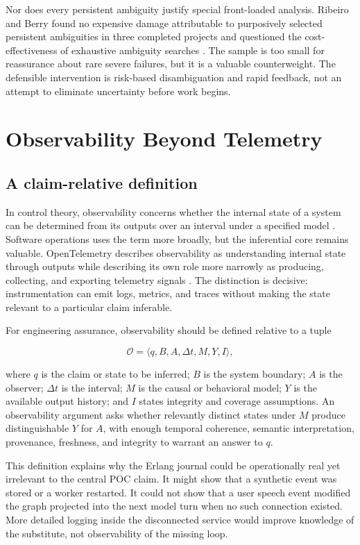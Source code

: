 \documentclass[10pt,a4paper]{article}
\begin{document}
Nor does every persistent ambiguity justify special front-loaded analysis. Ribeiro and Berry found no expensive damage attributable to purposively selected persistent ambiguities in three completed projects and questioned the cost-effectiveness of exhaustive ambiguity searches \cite{ribeiro2020}. The sample is too small for reassurance about rare severe failures, but it is a valuable counterweight. The defensible intervention is risk-based disambiguation and rapid feedback, not an attempt to eliminate uncertainty before work begins.

\section{Observability Beyond Telemetry}

\subsection{A claim-relative definition}

In control theory, observability concerns whether the internal state of a system can be determined from its outputs over an interval under a specified model \cite{kalman1960}. Software operations uses the term more broadly, but the inferential core remains valuable. OpenTelemetry describes observability as understanding internal state through outputs while describing its own role more narrowly as producing, collecting, and exporting telemetry signals \cite{otel}. The distinction is decisive: instrumentation can emit logs, metrics, and traces without making the state relevant to a particular claim inferable.

For engineering assurance, observability should be defined relative to a tuple

\begin{equation}
\mathcal{O}=\langle q, B, A, \Delta t, M, Y, I \rangle,
\end{equation}

where $q$ is the claim or state to be inferred; $B$ is the system boundary; $A$ is the observer; $\Delta t$ is the interval; $M$ is the causal or behavioral model; $Y$ is the available output history; and $I$ states integrity and coverage assumptions. An observability argument asks whether relevantly distinct states under $M$ produce distinguishable $Y$ for $A$, with enough temporal coherence, semantic interpretation, provenance, freshness, and integrity to warrant an answer to $q$.

This definition explains why the Erlang journal could be operationally real yet irrelevant to the central POC claim. It might show that a synthetic event was stored or a worker restarted. It could not show that a user speech event modified the graph projected into the next model turn when no such connection existed. More detailed logging inside the disconnected service would improve knowledge of the substitute, not observability of the missing loop.
\end{document}
